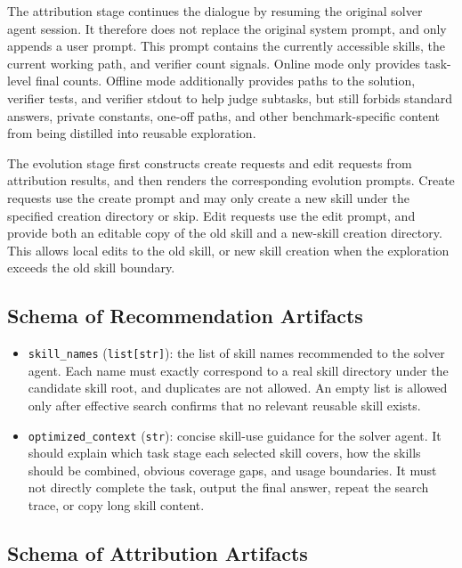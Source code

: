 \documentclass{llmxive}
\begin{document}
The attribution stage continues the dialogue by resuming the original solver agent session. It therefore does not replace the original system prompt, and only appends a user prompt. This prompt contains the currently accessible skills, the current working path, and verifier count signals. Online mode only provides task-level final counts. Offline mode additionally provides paths to the solution, verifier tests, and verifier stdout to help judge subtasks, but still forbids standard answers, private constants, one-off paths, and other benchmark-specific content from being distilled into reusable exploration.

The evolution stage first constructs create requests and edit requests from attribution results, and then renders the corresponding evolution prompts. Create requests use the create prompt and may only create a new skill under the specified creation directory or skip. Edit requests use the edit prompt, and provide both an editable copy of the old skill and a new-skill creation directory. This allows local edits to the old skill, or new skill creation when the exploration exceeds the old skill boundary.

\subsection{Schema of Recommendation Artifacts}

\begin{itemize}
    \item \texttt{skill\_names} (\texttt{list[str]}): the list of skill names recommended to the solver agent. Each name must exactly correspond to a real skill directory under the candidate skill root, and duplicates are not allowed. An empty list is allowed only after effective search confirms that no relevant reusable skill exists.
    \item \texttt{optimized\_context} (\texttt{str}): concise skill-use guidance for the solver agent. It should explain which task stage each selected skill covers, how the skills should be combined, obvious coverage gaps, and usage boundaries. It must not directly complete the task, output the final answer, repeat the search trace, or copy long skill content.
\end{itemize}

\subsection{Schema of Attribution Artifacts}
\end{document}
